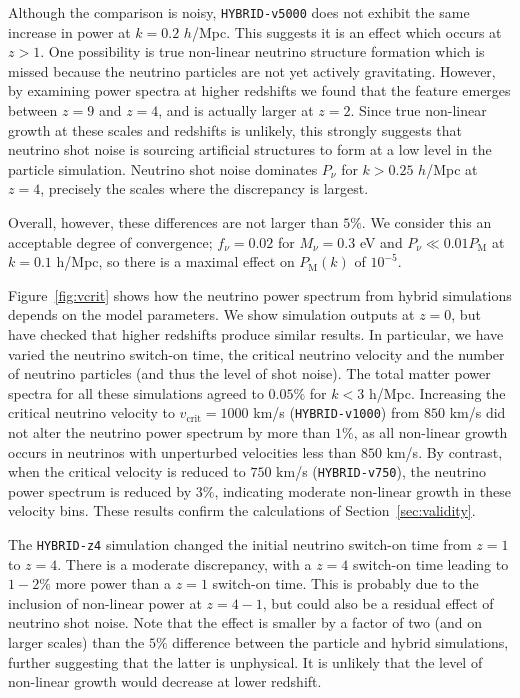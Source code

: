 \documentclass[useAMS, usenatbib]{mnras}
\begin{document}
Although the comparison is noisy, \texttt{HYBRID-v5000} does not exhibit the same increase in power at $k=0.2$ $h$/Mpc. This suggests it is an effect which occurs at $z > 1$. One possibility is true non-linear neutrino structure formation which is missed because the neutrino particles are not yet actively gravitating. However, by examining power spectra at higher redshifts we found that the feature emerges between $z=9$ and $z=4$, and is actually larger at $z=2$. Since true non-linear growth at these scales and redshifts is unlikely, this strongly suggests that neutrino shot noise is sourcing artificial structures to form at a low level in the particle simulation. Neutrino shot noise dominates $P_\nu$ for $k > 0.25$ $h$/Mpc at $z=4$, precisely the scales where the discrepancy is largest.

Overall, however, these differences are not larger than $5\%$. We consider this an acceptable degree of convergence; $f_\nu = 0.02$ for $M_\nu = 0.3$ eV and $P_\nu \ll 0.01 P_\mathrm{M}$ at $k = 0.1$ h/Mpc, so there is a maximal effect on $P_\mathrm{M}(k)$ of $10^{-5}$.

Figure~\ref{fig:vcrit} shows how the neutrino power spectrum from hybrid simulations depends on the model parameters. We show simulation outputs at $z=0$, but have checked that higher redshifts produce similar results. In particular, we have varied the neutrino switch-on time, the critical neutrino velocity and the number of neutrino particles (and thus the level of shot noise). The total matter power spectra for all these simulations agreed to $0.05\%$ for $k < 3$ h/Mpc. Increasing the critical neutrino velocity to $v_\mathrm{crit} = 1000$ km/s (\texttt{HYBRID-v1000}) from $850$ km/s did not alter the neutrino power spectrum by more than $1\%$, as all non-linear growth occurs in neutrinos with unperturbed velocities less than $850$ km/s. By contrast, when the critical velocity is reduced to $750$ km/s (\texttt{HYBRID-v750}), the neutrino power spectrum is reduced by $3\%$, indicating moderate non-linear growth in these velocity bins. These results confirm the calculations of Section~\ref{sec:validity}.

The \texttt{HYBRID-z4} simulation changed the initial neutrino switch-on time from $z=1$ to $z=4$. There is a moderate discrepancy, with a $z=4$ switch-on time leading to $1-2\%$ more power than a $z=1$ switch-on time. This is probably due to the inclusion of non-linear power at $z = 4-1$, but could also be a residual effect of neutrino shot noise. Note that the effect is smaller by a factor of two (and on larger scales) than the $5\%$ difference between the particle and hybrid simulations, further suggesting that the latter is unphysical. It is unlikely that the level of non-linear growth would decrease at lower redshift.
\end{document}
